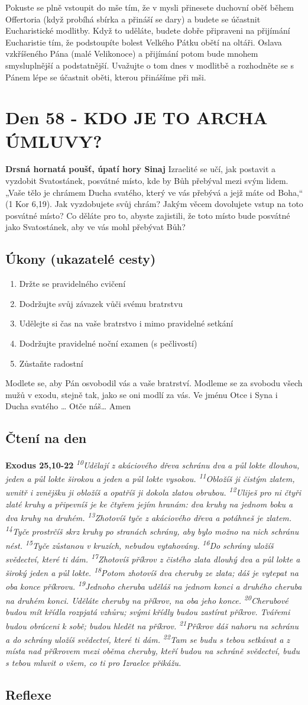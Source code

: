 \documentclass[11pt]{article}
\newcommand{\zacatekDevatyTyden}{
\textbf{Drsná hornatá poušť, úpatí hory Sinaj} \newline 
Izraelité se učí, jak postavit a vyzdobit Svatostánek, posvátné místo, kde by Bůh přebýval mezi svým lidem. „Vaše tělo je chrámem Ducha svatého, který ve vás přebývá a jejž máte od Boha,“ (1 Kor 6,19). Jak vyzdobujete svůj chrám? Jakým věcem dovolujete vstup na toto posvátné místo? Co děláte pro to, abyste zajistili, že toto místo bude posvátné jako Svatostánek, aby ve vás mohl přebývat Bůh?

\subsection*{Úkony (ukazatelé cesty)}
\begin{enumerate}
  \item Držte se pravidelného cvičení
  \item Dodržujte svůj závazek vůči svému bratrstvu
  \item Udělejte si čas na vaše bratrstvo i mimo pravidelné setkání
  \item Dodržujte pravidelné noční examen (s pečlivostí)
  \item Zůstaňte radostní
\end{enumerate}
Modlete se, aby Pán osvobodil vás a vaše bratrství. \newline
Modleme se za svobodu všech mužů v exodu, stejně tak, jako se oni modlí za vás.\newline
Ve jménu Otce i Syna i Ducha svatého …  Otče náš… Amen
}
\begin{document}
Pokuste se plně vstoupit do mše tím, že v mysli přinesete duchovní oběť během Offertoria (když probíhá sbírka a přináší se dary) a
budete se účastnit Eucharistické modlitby. Když to uděláte, budete dobře připraveni na přijímání Eucharistie tím, že podstoupíte
bolest Velkého Pátku obětí na oltáři. Oslava vzkříšeného Pána (malé Velikonoce) a přijímání potom bude mnohem smysluplnější a
podstatnější. Uvažujte o tom dnes v modlitbě a rozhodněte se s Pánem lépe se účastnit oběti, kterou přinášíme při mši.


\newpage
\section{Den 58 - KDO JE TO ARCHA ÚMLUVY?}
\zacatekDevatyTyden
\subsection*{Čtení na den}
\textbf{Exodus 25,10-22}
\newline
\textit{
\textsuperscript{10}Udělají z akáciového dřeva schránu dva a půl lokte dlouhou, jeden a půl lokte širokou a jeden a půl lokte vysokou.
\textsuperscript{11}Obložíš ji čistým zlatem, uvnitř i zvnějšku ji obložíš a opatříš ji dokola zlatou obrubou.
\textsuperscript{12}Uliješ pro ni čtyři zlaté kruhy a připevníš je ke čtyřem jejím hranám: dva kruhy na jednom boku a dva kruhy na druhém.
\textsuperscript{13}Zhotovíš tyče z akáciového dřeva a potáhneš je zlatem.
\textsuperscript{14}Tyče prostrčíš skrz kruhy po stranách schrány, aby bylo možno na nich schránu nést.
\textsuperscript{15}Tyče zůstanou v kruzích, nebudou vytahovány.
\textsuperscript{16}Do schrány uložíš svědectví, které ti dám.
\textsuperscript{17}Zhotovíš příkrov z čistého zlata dlouhý dva a půl lokte a široký jeden a půl lokte.
\textsuperscript{18}Potom zhotovíš dva cheruby ze zlata; dáš je vytepat na oba konce příkrovu.
\textsuperscript{19}Jednoho cheruba uděláš na jednom konci a druhého cheruba na druhém konci. Uděláte cheruby na příkrov, na oba jeho konce.
\textsuperscript{20}Cherubové budou mít křídla rozpjatá vzhůru; svými křídly budou zastírat příkrov. Tvářemi budou obráceni k sobě; budou hledět na příkrov.
\textsuperscript{21}Příkrov dáš nahoru na schránu a do schrány uložíš svědectví, které ti dám.
\textsuperscript{22}Tam se budu s tebou setkávat a z místa nad příkrovem mezi oběma cheruby, kteří budou na schráně svědectví, budu s tebou mluvit o všem, co ti pro Izraelce přikážu.
}

\subsection*{Reflexe}
\end{document}

